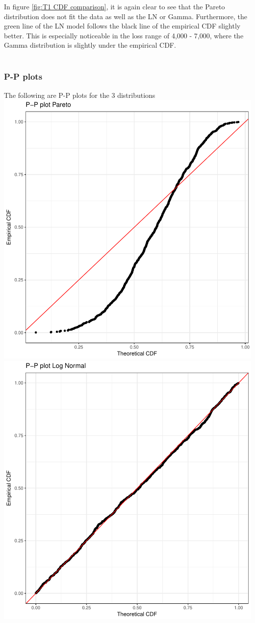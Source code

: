 \documentclass[titlepage]{article}
\begin{document}
	In figure \ref{fig:T1 CDF comparison}, it is again clear to see that the Pareto distribution does not fit the data as well as the LN or Gamma. Furthermore, the green line of the LN model follows the black line of the empirical CDF slightly better. This is especially noticeable in the loss range of 4,000 - 7,000, where the Gamma distribution is slightly under the empirical CDF.\\
	\\
	
	\subsubsection{P-P plots}
	The following are P-P plots for the 3 distributions\\
		\includegraphics[scale=0.3]{PP_pareto}
		\includegraphics[scale=0.3]{PP_LN}
\end{document}
